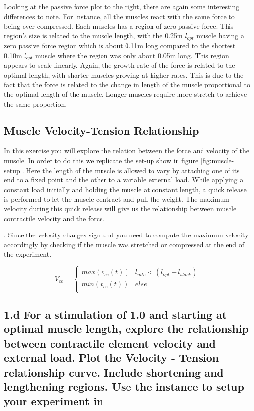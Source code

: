 \documentclass{cmc}
\begin{document}
Looking at the passive force plot to the right, there are again some interesting differences to note. For instance, all the muscles react with the same force to being over-compressed. Each muscles has a region of zero-passive-force. This region's size is related to the muscle length, with the 0.25m $l_{opt}$ muscle having a zero passive force region which is about 0.11m long compared to the shortest 0.10m $l_{opt}$ muscle where the region was only about 0.05m long. This region appears to scale linearly. Again, the growth rate of the force is related to the optimal length, with shorter muscles growing at higher rates. This is due to the fact that the force is related to the change in length of the muscle proportional to the optimal length of the muscle. Longer muscles require more stretch to achieve the same proportion.

\subsection*{Muscle Velocity-Tension Relationship}
In this exercise you will explore the relation between the force and
velocity of the muscle. In order to do this we replicate the set-up
show in figure \ref{fig:muscle-setup}. Here the length of the muscle
is allowed to vary by attaching one of its end to a fixed point and
the other to a variable external load. While applying a constant load
initially and holding the muscle at constant length, a quick release
is performed to let the muscle contract and pull the weight. The
maximum velocity during this quick release will give us the
relationship between muscle contractile velocity and the force.


 : Since the velocity changes sign and you need to compute the maximum
velocity accordingly by checking if the muscle was stretched or compressed
at the end of the experiment.

\begin{equation}
  \label{eq:2_lab5}
 V_{ce} = \left\{
\begin{array}{ll}
      max(v_{ce}(t)) & l_{mtc} < (l_{opt} + l_{slack}) \\
      min(v_{ce}(t)) & else \\
\end{array}
\right.
\end{equation}

\subsection*{1.d For a stimulation of 1.0 and starting at optimal
  muscle length, explore the relationship between contractile element
  velocity and external load. Plot the Velocity - Tension relationship
  curve. Include shortening and lengthening regions. Use the
   instance
  to setup your experiment in }
  
\end{document}
